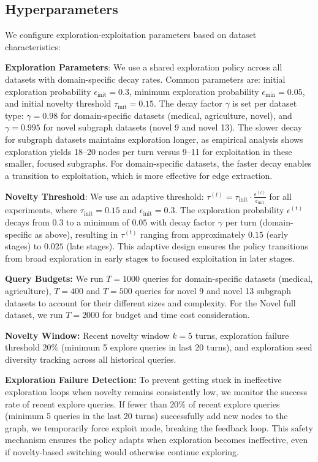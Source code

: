 \subsection{Hyperparameters}
\label{app:hyper}
We configure exploration-exploitation parameters based on dataset characteristics:

\textbf{Exploration Parameters}: We use a shared exploration policy across all datasets with domain-specific decay rates. Common parameters are: initial exploration probability $\epsilon_{\text{init}} = 0.3$, minimum exploration probability $\epsilon_{\min} = 0.05$, and initial novelty threshold $\tau_{\text{init}} = 0.15$. The decay factor $\gamma$ is set per dataset type: $\gamma = 0.98$ for domain-specific datasets (medical, agriculture, novel), and $\gamma = 0.995$ for novel subgraph datasets (novel 9 and novel 13). The slower decay for subgraph datasets maintains exploration longer, as empirical analysis shows exploration yields 18–20 nodes per turn versus 9–11 for exploitation in these smaller, focused subgraphs. For domain-specific datasets, the faster decay enables a transition to exploitation, which is more effective for edge extraction.

\textbf{Novelty Threshold}: We use an adaptive threshold: $\tau^{(t)} = \tau_{\text{init}} \cdot \frac{\epsilon^{(t)}}{\epsilon_{\text{init}}}$ for all experiments, where $\tau_{\text{init}} = 0.15$ and $\epsilon_{\text{init}} = 0.3$. The exploration probability $\epsilon^{(t)}$ decays from $0.3$ to a minimum of $0.05$ with decay factor $\gamma$ per turn (domain-specific as above), resulting in $\tau^{(t)}$ ranging from approximately $0.15$ (early stages) to $0.025$ (late stages). This adaptive design ensures the policy transitions from broad exploration in early stages to focused exploitation in later stages.

\textbf{Query Budgets:} We run $T = 1000$ queries for domain-specific datasets (medical, agriculture), $T = 400$ and $T=500$ queries for novel 9 and novel 13 subgraph datasets to account for their different sizes and complexity. For the Novel full dataset, we run $T=2000$ for budget and time cost consideration. 

\textbf{Novelty Window:} Recent novelty window $k = 5$ turns, exploration failure threshold $20\%$ (minimum 5 explore queries in last 20 turns), and exploration seed diversity tracking across all historical queries.

\textbf{Exploration Failure Detection:} To prevent getting stuck in ineffective exploration loops when novelty remains consistently low, we monitor the success rate of recent explore queries. If fewer than 20\% of recent explore queries (minimum 5 queries in the last 20 turns) successfully add new nodes to the graph, we temporarily force exploit mode, breaking the feedback loop. This safety mechanism ensures the policy adapts when exploration becomes ineffective, even if novelty-based switching would otherwise continue exploring.


